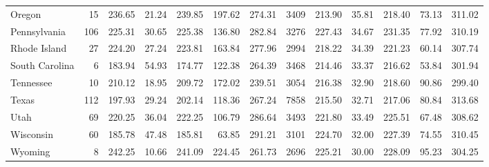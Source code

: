\begin{sidewaystable}[htb]
\begin{center}
{\begin{tabular}{lrrrrrr@{\extracolsep{10pt}}rrrrrr}
  Oregon &  15 & 236.65 & 21.24 & 239.85 & 197.62 & 274.31 & 3409 & 213.90 & 35.81 & 218.40 & 73.13 & 311.02 \\ 
  Pennsylvania & 106 & 225.31 & 30.65 & 225.38 & 136.80 & 282.84 & 3276 & 227.43 & 34.67 & 231.35 & 77.92 & 310.19 \\ 
  Rhode Island &  27 & 224.20 & 27.24 & 223.81 & 163.84 & 277.96 & 2994 & 218.22 & 34.39 & 221.23 & 60.14 & 307.74 \\ 
  South Carolina &   6 & 183.94 & 54.93 & 174.77 & 122.38 & 264.39 & 3468 & 214.46 & 33.37 & 216.62 & 53.84 & 301.94 \\ 
  Tennessee &  10 & 210.12 & 18.95 & 209.72 & 172.02 & 239.51 & 3054 & 216.38 & 32.90 & 218.60 & 90.86 & 299.40 \\ 
  Texas & 112 & 197.93 & 29.24 & 202.14 & 118.36 & 267.24 & 7858 & 215.50 & 32.71 & 217.06 & 80.84 & 313.68 \\ 
  Utah &  69 & 220.25 & 36.04 & 222.25 & 106.79 & 286.64 & 3493 & 221.80 & 33.49 & 225.51 & 67.48 & 308.62 \\ 
  Wisconsin &  60 & 185.78 & 47.48 & 185.81 & 63.85 & 291.21 & 3101 & 224.70 & 32.00 & 227.39 & 74.55 & 310.45 \\ 
  Wyoming &   8 & 242.25 & 10.66 & 241.09 & 224.45 & 261.73 & 2696 & 225.21 & 30.00 & 228.09 & 95.23 & 304.25 \\ 
   \hline
\end{tabular}
}
\end{center}
\end{sidewaystable}
